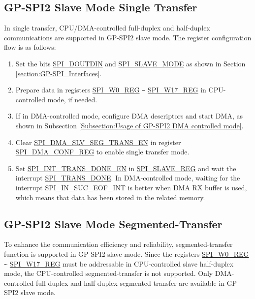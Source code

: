\documentclass[main\_\_EN.tex]{subfiles}
\begin{document}
\subsection{GP-SPI2 Slave Mode Single Transfer}\label{GP-SPI2 slave single transfer}

In single transfer, CPU/DMA-controlled full-duplex and half-duplex communications are supported in GP-SPI2 slave mode. The register configuration flow is as follows:
\begin{enumerate}
    \item Set the bits \hyperref[fielddesc:SPIDOUTDIN]{SPI\_DOUTDIN} and \hyperref[fielddesc:SPISLAVEMODE]{SPI\_SLAVE\_MODE} as shown in Section \ref{section:GP-SPI_Interfaces}.

    \item Prepare data in registers \hyperref[regdesc:SPIW0REG]{SPI\_W0\_REG} \verb+~+ \hyperref[regdesc:SPIW17REG]{SPI\_W17\_REG} in CPU-controlled mode, if needed.

    \item If in DMA-controlled mode, configure DMA descriptors and start DMA, as shown in Subsection \ref{Subsection:Usage of GP-SPI2 DMA controlled mode}.

    \item Clear \hyperref[fielddesc:SPIDMASLVSEGTRANSEN]{SPI\_DMA\_SLV\_SEG\_TRANS\_EN} in register \hyperref[regdesc:SPIDMACONFREG]{SPI\_DMA\_CONF\_REG} to enable single transfer mode.

    \item Set \hyperref[fielddesc:SPIINTTRANSDONEEN]{SPI\_INT\_TRANS\_DONE\_EN} in \hyperref[regdesc:SPISLAVEREG]{SPI\_SLAVE\_REG} and wait the interrupt \hyperref[fielddesc:SPITRANSDONE]{SPI\_TRANS\_DONE}. In DMA-controlled mode, waiting for the interrupt SPI\_IN\_SUC\_EOF\_INT is better when DMA RX buffer is used, which means that data has been stored in the related memory.
\end{enumerate}

\subsection{GP-SPI2 Slave Mode Segmented-Transfer}\label{GP-SPI2 slave seg-trans}

To enhance the communication efficiency and reliability, segmented-transfer function is supported in GP-SPI2 slave mode. Since the registers \hyperref[regdesc:SPIW0REG]{SPI\_W0\_REG} \verb+~+ \hyperref[regdesc:SPIW17REG]{SPI\_W17\_REG} must be addressable in CPU-controlled slave half-duplex mode, the CPU-controlled segmented-transfer is not supported. Only DMA-controlled full-duplex and half-duplex segmented-transfer are available in GP-SPI2 slave mode.
\end{document}
